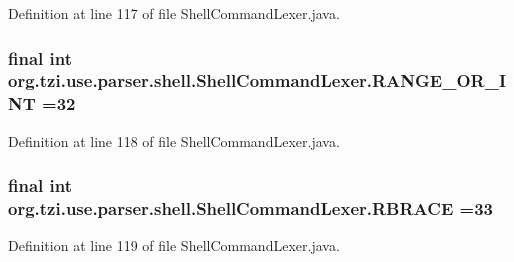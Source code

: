 Definition at line 117 of file Shell\-Command\-Lexer.\-java.

\hypertarget{classorg_1_1tzi_1_1use_1_1parser_1_1shell_1_1_shell_command_lexer_a488bbfc02330f44c8c7d8529d54ff64f}{
\subsubsection[{R\-A\-N\-G\-E\-\_\-\-O\-R\-\_\-\-I\-N\-T}]{\setlength{\rightskip}{0pt plus 5cm}final int org.\-tzi.\-use.\-parser.\-shell.\-Shell\-Command\-Lexer.\-R\-A\-N\-G\-E\-\_\-\-O\-R\-\_\-\-I\-N\-T =32\hspace{0.3cm}{\ttfamily [static]}}}\label{classorg_1_1tzi_1_1use_1_1parser_1_1shell_1_1_shell_command_lexer_a488bbfc02330f44c8c7d8529d54ff64f}


Definition at line 118 of file Shell\-Command\-Lexer.\-java.

\hypertarget{classorg_1_1tzi_1_1use_1_1parser_1_1shell_1_1_shell_command_lexer_aaaaec12c94184162a8fcb10ee553c9f0}{
\subsubsection[{R\-B\-R\-A\-C\-E}]{\setlength{\rightskip}{0pt plus 5cm}final int org.\-tzi.\-use.\-parser.\-shell.\-Shell\-Command\-Lexer.\-R\-B\-R\-A\-C\-E =33\hspace{0.3cm}{\ttfamily [static]}}}\label{classorg_1_1tzi_1_1use_1_1parser_1_1shell_1_1_shell_command_lexer_aaaaec12c94184162a8fcb10ee553c9f0}


Definition at line 119 of file Shell\-Command\-Lexer.\-java.

